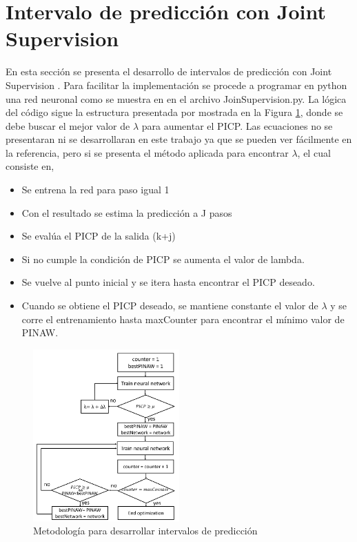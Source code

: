 \documentclass[12pt]{article}
\begin{document}
\section{Intervalo de predicción con Joint Supervision}
En esta sección se presenta el desarrollo de intervalos de predicción con Joint Supervision \cite{cruz_neural_2018}. Para facilitar la implementación se procede a programar en python una red neuronal como se muestra en \cite{git} en el archivo JoinSupervision.py. La lógica del código sigue la estructura presentada por \cite{cruz_neural_2018} mostrada en la Figura \ref{est_js}, donde se debe buscar el mejor valor de $\lambda$ para aumentar el PICP. Las ecuaciones no se presentaran ni se desarrollaran en este trabajo ya que se pueden ver fácilmente en la referencia, pero si se presenta el método aplicada para encontrar $\lambda$, el cual consiste en,
\begin{itemize}
\item Se entrena la red para paso igual 1
\item Con el resultado se estima la predicción a J pasos
\item Se evalúa el PICP de la salida (k+j)
\item Si no cumple la condición de PICP se aumenta el valor de lambda.
\item Se vuelve al punto inicial y se itera hasta encontrar el PICP deseado.
\item Cuando se obtiene el PICP deseado, se mantiene constante el valor de $\lambda$ y se corre el entrenamiento hasta maxCounter para encontrar el mínimo valor de PINAW.
\end{itemize}
\begin{figure}[!h]
	\centering
	\captionsetup{justification=centering}
	\includegraphics[width=0.5\textwidth]{imag/redes/estructura_js.png}
	\caption{Metodología para desarrollar intervalos de predicción}
	\label{est_js}
\end{figure}
\end{document}
